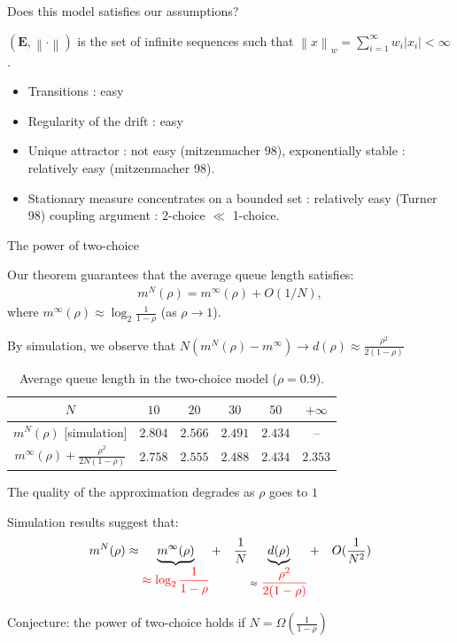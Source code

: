 \documentclass{beamer}
\newcommand\red[1]{{\color{red}#1}}
\newcommand\green[1]{{\color{green}#1}}
\newcommand\norm[1]{\left\|#1\right\|}
\newcommand\abs[1]{\left|#1\right|}
\newcommand\bE{\mathbf{E}}
\begin{document}
\begin{frame}{Does this model satisfies our assumptions? }
  
  $(\bE,\norm{\cdot})$ is the set of infinite sequences such that
  $\norm{x}_w=\sum_{i=1}^\infty w_i\abs{x_i}<\infty$. 

  \begin{itemize}
  \item Transitions : \green{easy}
  \item Regularity of the drift : \green{easy}
  \item Unique attractor : \red{not easy} (mitzenmacher 98),
    exponentially stable 
    : \green{relatively easy} (mitzenmacher 98). 
  \item Stationary measure concentrates on a bounded set :
    \green{relatively easy} (Turner 98) coupling argument : 2-choice
    $\ll$ 1-choice.
  \end{itemize}
\end{frame}


\begin{frame}{The power of two-choice}
  
  
  Our theorem guarantees that the average queue length satisfies:
  \begin{align*}
    m^N(\rho) = m^{\infty}(\rho) + O(1/N),
  \end{align*}
  where  $m^{\infty}(\rho) \approx 
  \log_2\frac1{1-\rho}$ (as $\rho\to1$). 

  \pause\bigskip 
  By simulation, we observe that
  $N(m^N(\rho)-m^{\infty})\to d(\rho)\approx\frac{\rho^2}{2(1-\rho)}$
  \bigskip

  \begin{table}[t]
    \centering
    \begin{tabular}{|c|c|c|c|c|c|}
      \hline
      $N$
      &$  10$  &$  20$  &$  30$  &$  50$ & $+\infty$  \\\hline
      $m^N(\rho)$ [simulation]
      &$2.804$ &$2.566$ &$2.491$ &$2.434$&-- \\\hline $m^\infty(\rho)+\frac{\rho^2}{2N(1-\rho)}$ 
      &$2.758$ &$2.555$ &$2.488$ &$2.434$&$2.353$ \\
      \hline
    \end{tabular}
  \caption{Average queue length in the two-choice model ($\rho=0.9$).}
  \label{tab:2}
\end{table}
  
\end{frame}

\begin{frame}{The quality of the approximation degrades as $\rho$
    goes to $1$}


  Simulation results suggest that: 
  \begin{align*}
    m^N(\rho) \approx \underbrace{m^{\infty}(\rho)}_{\displaystyle\color{red}\approx
    \log_2\frac1{1-\rho}} + \quad \frac1{N}\underbrace{d(\rho)}_{\approx \displaystyle\color{red}
    \frac{\rho^2}{2(1-\rho)}} +\quad O(\frac1{N^2})
  \end{align*}
  \bigskip
  

  \bigskip
  
  Conjecture: the power of two-choice holds if $N = \Omega(\frac1{1-\rho})$
\end{frame}
\end{document}

